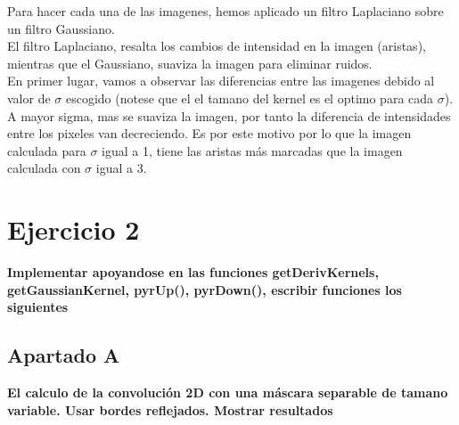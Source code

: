 \documentclass{article}
\begin{document}
Para hacer cada una de las imagenes, hemos aplicado un filtro Laplaciano sobre un filtro Gaussiano.
\\

El filtro Laplaciano, resalta los cambios de intensidad en la imagen (aristas), mientras que el Gaussiano, suaviza la imagen para eliminar ruidos.
\\

En primer lugar, vamos a observar las diferencias entre las imagenes debido al valor de $\sigma$ escogido (notese que el el tamano del kernel es el optimo para cada $\sigma$).
\\

A mayor sigma, mas se suaviza la imagen, por tanto la diferencia de intensidades entre los pixeles van decreciendo. Es por este motivo por lo que la imagen calculada para $\sigma$ igual a 1, tiene las aristas más marcadas que la imagen calculada con $\sigma$ igual a 3.
\\

\newpage
\section*{Ejercicio 2}
\textbf{Implementar apoyandose en las funciones getDerivKernels, getGaussianKernel, pyrUp(), pyrDown(), escribir funciones los siguientes}

\subsection*{Apartado A}
\textbf{El calculo de la convolución 2D con una máscara separable de tamano variable. Usar bordes reflejados. Mostrar resultados}
\end{document}
